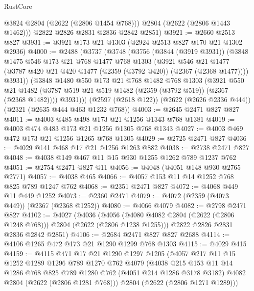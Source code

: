 \begin{lexlean}{RustCore}
\begin{coremodule}
          @3824
          @2804
          (@2622 (@2806 @1454 @768)))
        @2804
        (@2622 (@2806 @1443 @1462)))
      @2822
      @2826
      @2831
      @2836
      @2842
      @2851)
@3921 := @2660 @2513 @827
@3931 := @3921 @173 @21 @1303 (@2924 @2513 @827 @170 @21 @1302 @2936)
@4000 := @2488
    (@3737
      (@3748
        (@3756
          (@3844 (@3919 @3931))
          (@3848
            @1475
            @546
            @173
            @21
            @768
            @1477
            @768
            @1303
            (@3921
              @546
              @21
              @1477
              (@3787 @420 @21 @420 @1477 (@2359 (@3792 @420)) (@2367 (@2368 @1477))))
            @3931))
        (@3848
          @1480
          @550
          @173
          @21
          @768
          @1482
          @768
          @1303
          (@3921
            @550
            @21
            @1482
            (@3787 @519 @21 @519 @1482 (@2359 (@3792 @519)) (@2367 (@2368 @1482))))
          @3931)))
    (@2597 (@2618 @122))
    (@2622 (@2626 @2336 @444))
    (@2321 (@2635 @444 @463 @1232 @768))
@4003 := @2645 @2471 @827 @827
@4011 := @4003 @485 @498 @173 @21 @1256 @1343 @768 @1381
@4019 := @4003 @474 @483 @173 @21 @1256 @1305 @768 @1343
@4027 := @4003 @469 @472 @173 @21 @1256 @1265 @768 @1305
@4029 := @2725 @2471 @827
@4036 := @4029 @141 @468 @17 @21 @1256 @1263 @882
@4038 := @2738 @2471 @827
@4048 := @4038 @149 @467 @11 @15 @930 @1255 @1262 @789 @1237 @762
@4051 := @2754 @2471 @827 @11
@4056 := @4048 (@4051 @148 @930 @2765 @2771)
@4057 := @4038 @465
@4066 := @4057 @153 @11 @14 @1252 @768 @825 @789 @1247 @762
@4068 := @2351 @2471 @827
@4072 := @4068 @449 @11 @449 @1252
@4073 := @2360 @2471
@4079 := @4072 (@2359 (@4073 @449)) (@2367 (@2368 @1252))
@4080 := @4066 @4079
@4082 := @2798 @2471 @827
@4102 := @4027
    (@4036
      (@4056 (@4080 @4082 @2804 (@2622 (@2806 @1248 @768))) @2804 (@2622 (@2806 @1238 @1255)))
      @2822
      @2826
      @2831
      @2836
      @2842
      @2851)
@4106 := @2684 @2471 @827 @827 @2688
@4114 := @4106 @1265 @472 @173 @21 @1290 @1299 @768 @1303
@4115 := @4029 @415
@4159 := @4115
    @471
    @17
    @21
    @1290
    @1297
    @1205
    (@4057
      @217
      @11
      @15
      @1252
      @1289
      @1296
      @789
      @1270
      @762
      @4079
      (@4038
        @215
        @153
        @11
        @14
        @1286
        @768
        @825
        @789
        @1280
        @762
        (@4051 @214 @1286 @3178 @3182)
        @4082
        @2804
        (@2622 (@2806 @1281 @768)))
      @2804
      (@2622 (@2806 @1271 @1289)))

\end{coremodule}
\end{lexlean}
